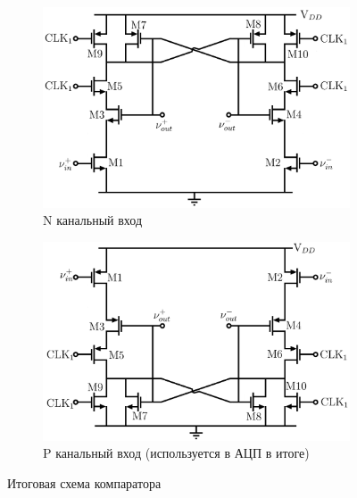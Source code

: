 \documentclass[a4paper,12pt]{article} %
\begin{document}
\begin{figure}[H]
    \begin{subfigure}[b]{0.45\textwidth}
      \includegraphics[width=\textwidth]{comparator_N}
      \caption{ N канальный вход }
      \label{pic:comparator_N}
    \end{subfigure}
    \begin{subfigure}[b]{0.45\textwidth}
      \includegraphics[width=\textwidth]{comparator}
      \caption{ P канальный вход (используется в АЦП в итоге) }
      \label{pic:comparator}
    \end{subfigure}
    \caption{Итоговая схема компаратора}
  \end{figure}
\end{document}

